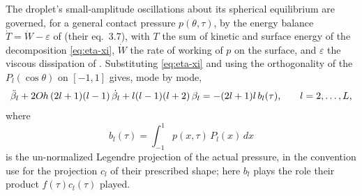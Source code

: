 The droplet's small-amplitude oscillations about its spherical equilibrium are governed, for a general contact pressure $p(\theta,\tau)$, by the energy balance $\dot T=\dot W-\varepsilon$ of \cite{AlventosaEtAl2023} (their eq.~3.7), with $T$ the sum of kinetic and surface energy of the decomposition \eqref{eq:eta-xi}, $\dot W$ the rate of working of $p$ on the surface, and $\varepsilon$ the viscous dissipation of \cite{lamb1924hydrodynamics}. Substituting \eqref{eq:eta-xi} and using the orthogonality of the $P_l(\cos\theta)$ on $[-1,1]$ gives, mode by mode,
\begin{equation}
    \ddot\beta_l + 2O\kern-0.04em h\,(2l+1)(l-1)\, \dot\beta_l + l(l-1)(l+2)\, \beta_l = -(2l+1)l\, b_l(\tau)\text{,}\qquad l=2,\dots,L\text{,}
    \label{eq:drop-mode}
\end{equation}
where
\begin{equation}
    b_l(\tau) = \int_{-1}^1 p(x,\tau)\, P_l(x)\, dx
    \label{eq:b_l-def}
\end{equation}
is the un-normalized Legendre projection of the actual pressure, in the convention \cite{AlventosaEtAl2023} use for the projection $c_l$ of their prescribed shape; here $b_l$ plays the role their product $f(\tau)c_l(\tau)$ played.

